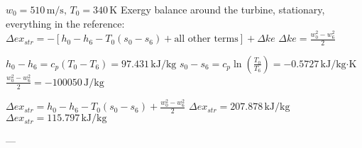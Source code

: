 \( w_0 = 510 \, \text{m/s}, \, T_0 = 340 \, \text{K} \)  
Exergy balance around the turbine, stationary, everything in the reference:  
\( \Delta ex_{str} = -[h_0 - h_6 - T_0 (s_0 - s_6) + \text{all other terms}] + \Delta ke \)  
\( \Delta ke = \frac{w_0^2 - w_6^2}{2} \)  

\( h_0 - h_6 = c_p (T_0 - T_6) = 97.431 \, \text{kJ/kg} \)  
\( s_0 - s_6 = c_p \ln \left( \frac{T_0}{T_6} \right) = -0.5727 \, \text{kJ/kg·K} \)  
\( \frac{w_0^2 - w_6^2}{2} = -100050 \, \text{J/kg} \)  

\( \Delta ex_{str} = h_0 - h_6 - T_0 (s_0 - s_6) + \frac{w_0^2 - w_6^2}{2} \)  
\( \Delta ex_{str} = 207.878 \, \text{kJ/kg} \)  
\( \Delta ex_{str} = 115.797 \, \text{kJ/kg} \)  

---